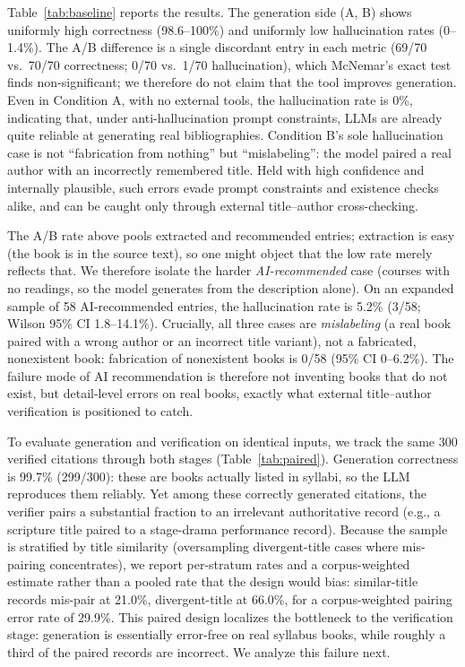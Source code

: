 \documentclass[conference]{IEEEtran}
\begin{document}
Table~\ref{tab:baseline} reports the results. The generation side (A, B) shows
uniformly high correctness (98.6--100\%) and uniformly low hallucination rates
(0--1.4\%). The A/B difference is a single discordant entry in each metric
(69/70 vs.\ 70/70 correctness; 0/70 vs.\ 1/70 hallucination), which McNemar's
exact test finds non-significant; we therefore do not claim that the tool
improves generation. Even in Condition A, with no external tools, the
hallucination rate
is 0\%, indicating that, under anti-hallucination prompt constraints, LLMs are
already quite reliable at generating real bibliographies. Condition B's sole
hallucination case is not ``fabrication from nothing'' but ``mislabeling'': the
model paired a real author with an incorrectly remembered title. Held with high
confidence and internally plausible, such errors evade prompt constraints and
existence checks alike, and can be caught only through external
title--author cross-checking.

The A/B rate above pools extracted and recommended entries; extraction is easy
(the book is in the source text), so one might object that the low rate merely
reflects that. We therefore isolate the harder \emph{AI-recommended} case
(courses with no readings, so the model generates from the description alone). On an expanded sample of 58
AI-recommended entries, the hallucination rate is 5.2\% (3/58; Wilson 95\% CI
1.8--14.1\%). Crucially, all three cases are \emph{mislabeling} (a real book
paired with a wrong author or an incorrect title variant), not a fabricated,
nonexistent book: fabrication of nonexistent books is 0/58 (95\% CI 0--6.2\%).
The failure mode of AI recommendation is therefore not inventing books that do
not exist, but detail-level errors on real books, exactly what external
title--author verification is positioned to catch.

To evaluate generation and verification on identical inputs, we track the same
300 verified citations through both stages (Table~\ref{tab:paired}). Generation
correctness is 99.7\% (299/300): these are books actually listed in syllabi, so
the LLM reproduces them reliably. Yet among these correctly generated citations,
the verifier pairs a substantial fraction to an irrelevant authoritative record
(e.g., a scripture title paired to a stage-drama performance record). Because the
sample is stratified by title similarity (oversampling divergent-title cases
where mis-pairing concentrates), we report per-stratum rates and a corpus-weighted
estimate rather than a pooled rate that the design would bias: similar-title
records mis-pair at 21.0\%, divergent-title at 66.0\%, for a corpus-weighted
pairing error rate of 29.9\%. This paired design localizes the bottleneck to the
verification stage: generation is essentially error-free on real syllabus books,
while roughly a third of the paired records are incorrect. We analyze this
failure next.
\end{document}
